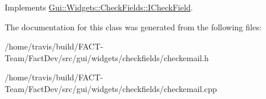 Implements \hyperlink{classGui_1_1Widgets_1_1CheckFields_1_1ICheckField_a818700a4a8c95eacfc39b85c74e71144}{Gui\-::\-Widgets\-::\-Check\-Fields\-::\-I\-Check\-Field}.



The documentation for this class was generated from the following files\-:\begin{DoxyCompactItemize}
\item 
/home/travis/build/\-F\-A\-C\-T-\/\-Team/\-Fact\-Dev/src/gui/widgets/checkfields/checkemail.\-h\item 
/home/travis/build/\-F\-A\-C\-T-\/\-Team/\-Fact\-Dev/src/gui/widgets/checkfields/checkemail.\-cpp\end{DoxyCompactItemize}

